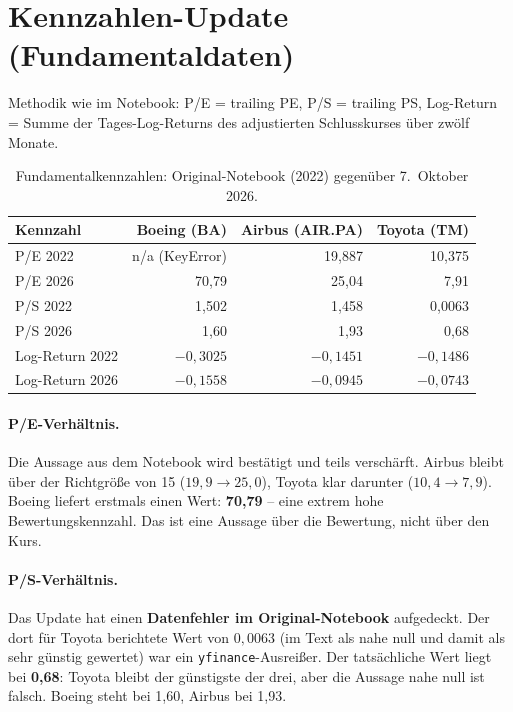 \section{Kennzahlen-Update (Fundamentaldaten)}

Methodik wie im Notebook: P/E = trailing PE, P/S = trailing PS, Log-Return = Summe der
Tages-Log-Returns des adjustierten Schlusskurses über zwölf Monate.

\begin{table}[H]
  \centering
  \caption{Fundamentalkennzahlen: Original-Notebook (2022) gegenüber 7.\ Oktober 2026.}
  \label{tab:kennzahlen}
  \begin{tabular}{lrrr}
    \toprule
    Kennzahl & Boeing (BA) & Airbus (AIR.PA) & Toyota (TM)\\
    \midrule
    P/E 2022        & n/a (KeyError) & 19,887 & 10,375\\
    P/E 2026        & 70,79          & 25,04  & 7,91\\
    P/S 2022        & 1,502          & 1,458  & 0,0063\\
    P/S 2026        & 1,60           & 1,93   & 0,68\\
    Log-Return 2022 & $-0{,}3025$    & $-0{,}1451$ & $-0{,}1486$\\
    Log-Return 2026 & $-0{,}1558$    & $-0{,}0945$ & $-0{,}0743$\\
    \bottomrule
  \end{tabular}
\end{table}

\paragraph{P/E-Verhältnis.} Die Aussage aus dem Notebook wird bestätigt und teils verschärft.
Airbus bleibt über der Richtgröße von 15 ($19{,}9 \rightarrow 25{,}0$), Toyota klar darunter
($10{,}4 \rightarrow 7{,}9$). Boeing liefert erstmals einen Wert: \textbf{70,79} -- eine
extrem hohe Bewertungskennzahl. Das ist eine Aussage über die Bewertung, nicht über den
Kurs.

\paragraph{P/S-Verhältnis.} Das Update hat einen \textbf{Datenfehler im Original-Notebook}
aufgedeckt. Der dort für Toyota berichtete Wert von $0{,}0063$ (im Text als \glqq nahe
null\grqq{} und damit als sehr günstig gewertet) war ein \texttt{yfinance}-Ausreißer. Der
tatsächliche Wert liegt bei \textbf{0,68}: Toyota bleibt der günstigste der drei, aber die
Aussage \glqq nahe null\grqq{} ist falsch. Boeing steht bei 1,60, Airbus bei 1,93.

